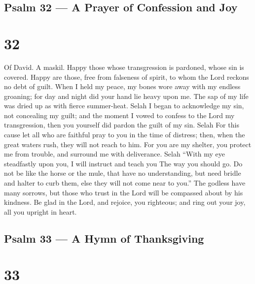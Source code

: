 \hypertarget{psalm-32-a-prayer-of-confession-and-joy}{%
\subsection{Psalm 32 --- A Prayer of Confession and
Joy}\label{psalm-32-a-prayer-of-confession-and-joy}}

\hypertarget{section-31}{%
\section{32}\label{section-31}}

Of David. A maskil.  Happy those whose transgression is
pardoned, whose sin is covered.  Happy are those, free from
falseness of spirit, to whom the Lord reckons no debt of guilt.
 When I held my peace, my bones wore away with my endless
groaning;  for day and night did your hand lie heavy upon
me. The sap of my life was dried up as with fierce summer-heat. Selah
 I began to acknowledge my sin, not concealing my guilt; and
the moment I vowed to confess to the Lord my transgression, then you
yourself did pardon the guilt of my sin. Selah  For this
cause let all who are faithful pray to you in the time of distress;
then, when the great waters rush, they will not reach to him.
 For you are my shelter, you protect me from trouble, and
surround me with deliverance. Selah  ``With my eye
steadfastly upon you, I will instruct and teach you The way you should
go.  Do not be like the horse or the mule, that have no
understanding, but need bridle and halter to curb them, else they will
not come near to you.''  The godless have many sorrows, but
those who trust in the Lord will be compassed about by his kindness.
 Be glad in the Lord, and rejoice, you righteous; and ring
out your joy, all you upright in heart.

\hypertarget{psalm-33-a-hymn-of-thanksgiving}{%
\subsection{Psalm 33 --- A Hymn of
Thanksgiving}\label{psalm-33-a-hymn-of-thanksgiving}}

\hypertarget{section-32}{%
\section{33}\label{section-32}}

